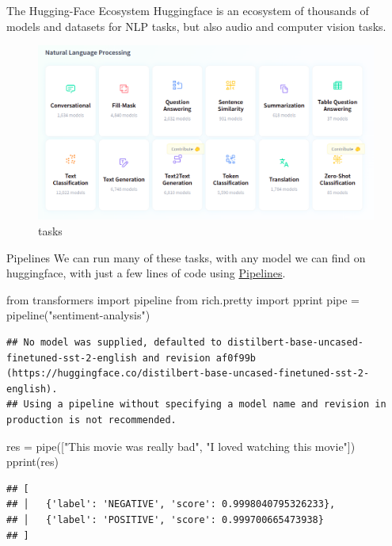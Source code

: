 \documentclass[
  10pt,
  ignorenonframetext,
  aspectratio=169]{beamer}
\newenvironment{Shaded}{\begin{snugshade}}{\end{snugshade}}
\newcommand{\ImportTok}[1]{\textcolor[rgb]{0.80,0.80,0.80}{#1}}
\newcommand{\NormalTok}[1]{\textcolor[rgb]{0.80,0.80,0.80}{#1}}
\newcommand{\OperatorTok}[1]{\textcolor[rgb]{0.94,0.94,0.82}{#1}}
\newcommand{\StringTok}[1]{\textcolor[rgb]{0.80,0.58,0.58}{#1}}
\begin{document}
\begin{frame}{The Hugging-Face Ecosystem}
\protect\hypertarget{the-hugging-face-ecosystem}{}
Huggingface is an ecosystem of thousands of models and datasets for NLP
tasks, but also audio and computer vision tasks.

\begin{figure}
\centering
\includegraphics{images/hf-tasks.png}
\caption{tasks}
\end{figure}
\end{frame}

\begin{frame}[fragile]{Pipelines}
\protect\hypertarget{pipelines}{}
We can run many of these tasks, with any model we can find on
huggingface, with just a few lines of code using
\href{https://huggingface.co/docs/transformers/main_classes/pipelines}{Pipelines}.

\scriptsize

\begin{Shaded}
\begin{Highlighting}[]
\ImportTok{from}\NormalTok{ transformers }\ImportTok{import}\NormalTok{ pipeline}
\ImportTok{from}\NormalTok{ rich.pretty }\ImportTok{import}\NormalTok{ pprint}
\NormalTok{pipe }\OperatorTok{=}\NormalTok{ pipeline(}\StringTok{"sentiment{-}analysis"}\NormalTok{)}
\end{Highlighting}
\end{Shaded}

\begin{verbatim}
## No model was supplied, defaulted to distilbert-base-uncased-finetuned-sst-2-english and revision af0f99b (https://huggingface.co/distilbert-base-uncased-finetuned-sst-2-english).
## Using a pipeline without specifying a model name and revision in production is not recommended.
\end{verbatim}

\begin{Shaded}
\begin{Highlighting}[]
\NormalTok{res }\OperatorTok{=}\NormalTok{ pipe([}\StringTok{"This movie was really bad"}\NormalTok{, }\StringTok{"I loved watching this movie"}\NormalTok{])}
\NormalTok{pprint(res)}
\end{Highlighting}
\end{Shaded}

\begin{verbatim}
## [
## │   {'label': 'NEGATIVE', 'score': 0.9998040795326233},
## │   {'label': 'POSITIVE', 'score': 0.999700665473938}
## ]
\end{verbatim}
\end{frame}
\end{document}
